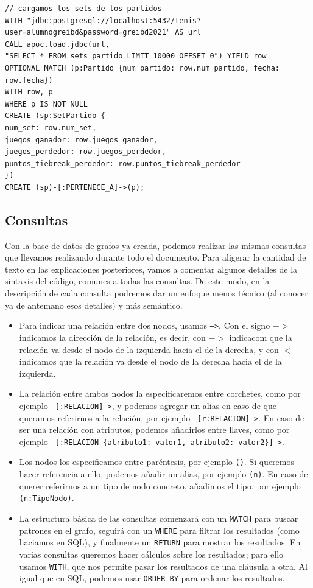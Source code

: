 \begin{verbatim}
// cargamos los sets de los partidos
WITH "jdbc:postgresql://localhost:5432/tenis?user=alumnogreibd&password=greibd2021" AS url
CALL apoc.load.jdbc(url,
"SELECT * FROM sets_partido LIMIT 10000 OFFSET 0") YIELD row
OPTIONAL MATCH (p:Partido {num_partido: row.num_partido, fecha: row.fecha})
WITH row, p
WHERE p IS NOT NULL
CREATE (sp:SetPartido {
num_set: row.num_set,
juegos_ganador: row.juegos_ganador,
juegos_perdedor: row.juegos_perdedor,
puntos_tiebreak_perdedor: row.puntos_tiebreak_perdedor
})
CREATE (sp)-[:PERTENECE_A]->(p);
\end{verbatim}


\subsection{Consultas}

Con la base de datos de grafos ya creada, podemos realizar las mismas consultas que llevamos realizando durante todo el documento. Para aligerar la cantidad de texto en las explicaciones posteriores, vamos a comentar algunos detalles de la sintaxis del código, comunes a todas las consultas. De este modo, en la descripción de cada consulta podremos dar un enfoque menos técnico (al conocer ya de antemano esos detalles) y más semántico. 
\begin{itemize}
\item Para indicar una relación entre dos nodos, usamos \texttt{-->}. Con el signo $->$ indicamos la dirección de la relación, es decir, con $->$ indicacom que la relación va desde el nodo de la izquierda hacia el de la derecha, y con $<-$ indicamos que la relación va desde el nodo de la derecha hacia el de la izquierda.
\item La relación entre ambos nodos la especificaremos entre corchetes, como por ejemplo \texttt{-[:RELACION]->}, y podemos agregar un alias en caso de que queramos referirnos a la relación, por ejemplo \texttt{-[r:RELACION]->}. En caso de ser una relación con atributos, podemos añadirlos entre llaves, como por ejemplo \texttt{-[:RELACION \{atributo1: valor1, atributo2: valor2\}]->}.
\item Los nodos los especificamos entre paréntesis, por ejemplo \texttt{()}. Si queremos hacer referencia a ello, podemos añadir un alias, por ejemplo \texttt{(n)}. En caso de querer referirnos a un tipo de nodo concreto, añadimos el tipo, por ejemplo \texttt{(n:TipoNodo)}.
\item La estructura básica de las consultas comenzará con un \texttt{MATCH} para buscar patrones en el grafo, seguirá con un \texttt{WHERE} para filtrar los resultados (como haciamos en SQL), y finalmente un \texttt{RETURN} para mostrar los resultados. En varias consultas queremos hacer cálculos sobre los resultados; para ello usamos \texttt{WITH}, que nos permite pasar los resultados de una cláusula a otra. Al igual que en SQL, podemos usar \texttt{ORDER BY} para ordenar los resultados.
\end{itemize}

